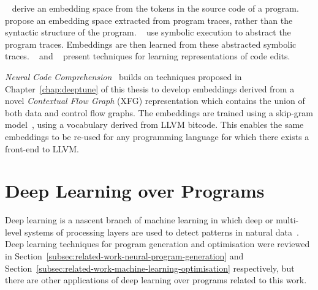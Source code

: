 \citeauthor{Mou2016}~\cite{Mou2016} derive an embedding space from the tokens in the source code of a program.
\citeauthor{Wang2017d}~\cite{Wang2017d} propose an embedding space extracted from program traces, rather than the syntactic structure of the program.
\citeauthor{Henkel2018}~\cite{Henkel2018} use symbolic execution to abstract the program traces. Embeddings are then learned from these abstracted symbolic traces.
%
\citeauthor{Yin2018}~\cite{Yin2018} and \citeauthor{Tufano2019}~\cite{Tufano2019} present techniques for learning representations of code edits.

\emph{Neural Code Comprehension}~\cite{Ben-nun2018} builds on techniques proposed in Chapter~\ref{chap:deeptune} of this thesis to develop embeddings derived from a novel \emph{Contextual Flow Graph} (XFG) representation which contains the union of both data and control flow graphs. The embeddings are trained using a skip-gram model~\cite{Mikolov2013a}, using a vocabulary derived from LLVM bitcode. This enables the same embeddings to be re-used for any programming language for which there exists a front-end to LLVM.



\section{Deep Learning over Programs}
\label{sec:related-work-other}

Deep learning is a nascent branch of machine learning in which deep or multi-level systems of processing layers are used to detect patterns in natural data~\cite{LeCun2015,Wang2017}. Deep learning techniques for program generation and optimisation were reviewed in Section~\ref{subsec:related-work-neural-program-generation} and Section~\ref{subsec:related-work-machine-learning-optimisation} respectively, but there are other applications of deep learning over programs related to this work.

